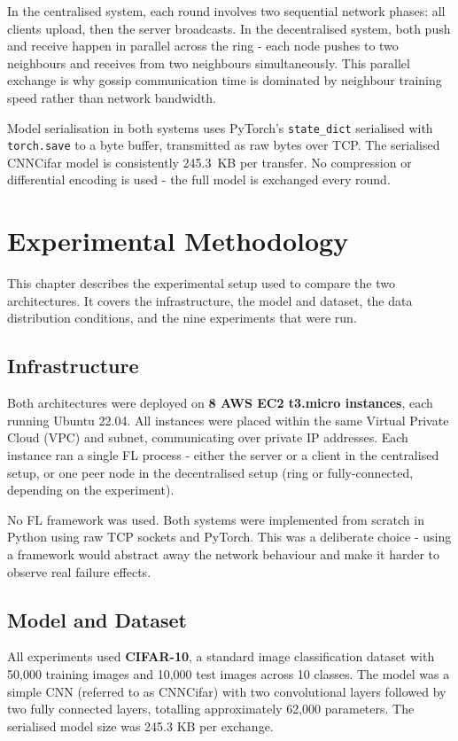 \documentclass[12pt]{report}
\begin{document}
In the centralised system, each round involves two sequential network
phases: all clients upload, then the server broadcasts. In the
decentralised system, both push and receive happen in parallel across
the ring - each node pushes to two neighbours and receives from two
neighbours simultaneously. This parallel exchange is why gossip
communication time is dominated by neighbour training speed rather
than network bandwidth.
 
Model serialisation in both systems uses PyTorch's \texttt{state\_dict}
serialised with \texttt{torch.save} to a byte buffer, transmitted
as raw bytes over TCP. The serialised CNNCifar model is consistently
245.3~KB per transfer. No compression or differential encoding is used
- the full model is exchanged every round.

\chapter{Experimental Methodology}

This chapter describes the experimental setup used to compare the two
architectures. It covers the infrastructure, the model and dataset, the
data distribution conditions, and the nine experiments that were run.

\section{Infrastructure}

Both architectures were deployed on \textbf{8 AWS EC2 t3.micro instances},
each running Ubuntu 22.04. All instances were placed within the same Virtual
Private Cloud (VPC) and subnet, communicating over private IP addresses. Each
instance ran a single FL process - either the server or a client in the
centralised setup, or one peer node in the decentralised setup (ring or
fully-connected, depending on the experiment).

No FL framework was used. Both systems were implemented from scratch in Python
using raw TCP sockets and PyTorch. This was a deliberate choice - using a
framework would abstract away the network behaviour and make it harder to observe
real failure effects.

\section{Model and Dataset}

All experiments used \textbf{CIFAR-10}, a standard image classification dataset
with 50,000 training images and 10,000 test images across 10 classes. The model
was a simple CNN (referred to as CNNCifar) with two convolutional layers followed
by two fully connected layers, totalling approximately 62,000 parameters. The
serialised model size was 245.3 KB per exchange.
\end{document}
